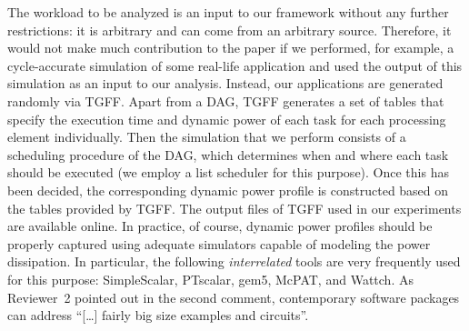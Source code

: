 \begin{authors}
The workload to be analyzed is an input to our framework without any further restrictions: it is arbitrary and can come from an arbitrary source.
Therefore, it would not make much contribution to the paper if we performed, for example, a cycle-accurate simulation of some real-life application and used the output of this simulation as an input to our analysis.
Instead, our applications are generated randomly via TGFF.
Apart from a DAG, TGFF generates a set of tables that specify the execution time and dynamic power of each task for each processing element individually.
Then the simulation that we perform consists of a scheduling procedure of the DAG, which determines when and where each task should be executed (we employ a list scheduler for this purpose).
Once this has been decided, the corresponding dynamic power profile is constructed based on the tables provided by TGFF.
The output files of TGFF used in our experiments are available online.
In practice, of course, dynamic power profiles should be properly captured using adequate simulators capable of modeling the power dissipation.
In particular, the following \emph{interrelated} tools are very frequently used for this purpose: SimpleScalar, PTscalar, gem5, McPAT, and Wattch.
As Reviewer~2 pointed out in the second comment, contemporary software packages can address ``[\ldots] fairly big size examples and circuits''.


\end{authors}

